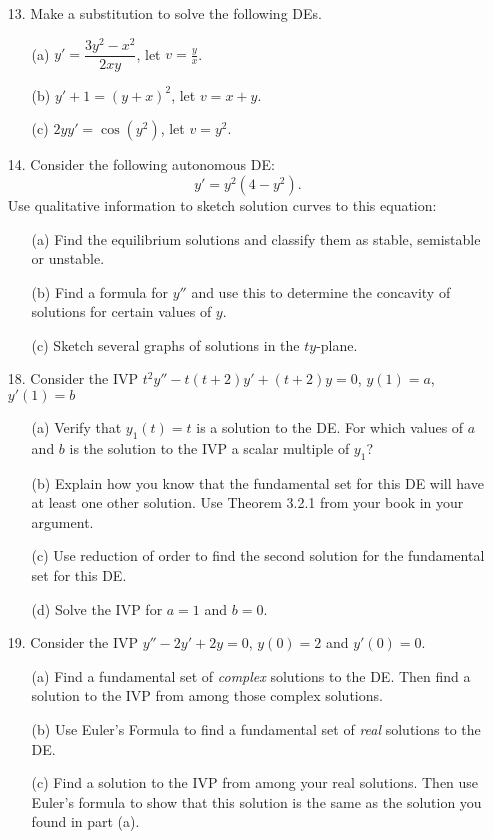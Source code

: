 \documentclass[12pt]{article}
\begin{document}
\begin{itemize}
\item[13.] Make a substitution to solve the following DEs.  
\begin{itemize}
\item[(a)] $y' = \dfrac{3y^2-x^2}{2xy}$, let $v= \frac{y}{x}$.
\item[(b)] $y' + 1 = (y+x)^2$, let $v = x+y$.
\item[(c)] $2yy' = \cos(y^2)$, let $v = y^2$.
\end{itemize}


\item[14.] Consider the following autonomous DE:
$$ y' = y^2(4-y^2).$$
Use qualitative information to sketch solution curves to this equation:
\begin{itemize}
\item[(a)] Find the equilibrium solutions and classify them as stable, semistable or unstable.
\item[(b)] Find a formula for $y''$ and use this to determine the concavity of solutions for certain values of $y$.
\item[(c)] Sketch several graphs of solutions in the $ty$-plane.
\end{itemize}




\item[18.] Consider the IVP $t^2y'' - t(t+2)y' + (t+2)y = 0$, $y(1)=a$, $y'(1)=b$
\begin{itemize}
\item[(a)] Verify that $y_1(t) = t$ is a solution to the DE.  For which values of $a$ and $b$ is the solution to the IVP a scalar multiple of $y_1$?
\item[(b)] Explain how you know that the fundamental set for this DE will have at least one other solution.  Use Theorem 3.2.1 from your book in your argument.
\item[(c)] Use reduction of order to find the second solution for the fundamental set for this DE.
\item[(d)] Solve the IVP for $a = 1$ and $b=0$.
\end{itemize}



\item[19.] Consider the IVP $y''-2y'+2y = 0$, $y(0) = 2$ and $y'(0) = 0$.  
\begin{itemize}
\item[(a)] Find a fundamental set of \textit{complex} solutions to the DE.  Then find a solution to the IVP from among those complex solutions.
\item[(b)] Use Euler's Formula to find a fundamental set of \textit{real} solutions to the DE.
\item[(c)] Find a solution to the IVP from among your real solutions.  Then use Euler's formula to show that this solution is the same as the solution you found in part (a).
\end{itemize}



\end{itemize}


\end{document}
